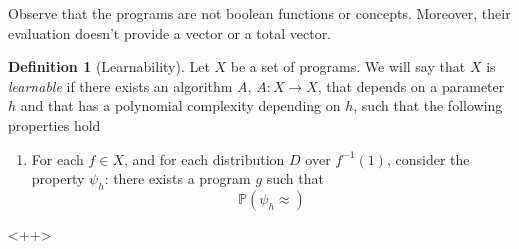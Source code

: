 \documentclass[a4paper,11pt]{article}
\theoremstyle{definition}
\newtheorem{defn}{Definition}
\begin{document}
Observe that the programs are not boolean functions or concepts. Moreover,
their evaluation doesn't provide a vector or a total vector.
\begin{defn}[Learnability]
  Let $X$ be a set of programs. We will say that $X$ is \textit{learnable} if there
  exists an algorithm $A$, $A:X\to X$, that depends on a parameter $h$ and
  that has a polynomial complexity depending on $h$, such that the following
  properties hold
  \begin{enumerate}
    \item For each $f\in X$, and for each distribution $D$ over $f^{-1}(1)$,
      consider the property $\psi_h$: there exists a program $g$ such that
      \[
        \mathbb{P}\left( \psi_h \approx  \right)
      \]
  \end{enumerate}
\end{defn}<++>
\end{document}
